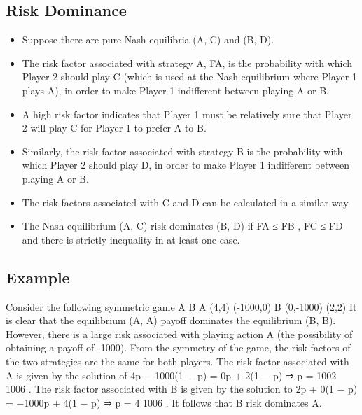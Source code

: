 \documentclass[]{report}
\begin{document}
\subsection{Risk Dominance}
\begin{itemize}
	\item Suppose there are pure Nash equilibria (A, C) and (B, D).
	\item The risk factor associated with strategy A, FA, is the probability
	with which Player 2 should play C (which is used at the Nash
	equilibrium where Player 1 plays A), in order to make Player 1
	indifferent between playing A or B.
	\item 	A high risk factor indicates that Player 1 must be relatively sure
	that Player 2 will play C for Player 1 to prefer A to B.
	\item 	Similarly, the risk factor associated with strategy B is the
	probability with which Player 2 should play D, in order to make
	Player 1 indifferent between playing A or B.
\end{itemize}

\begin{itemize}
	\item The risk factors associated with C and D can be calculated in a
	similar way.
	\item The Nash equilibrium (A, C) risk dominates (B, D) if FA ≤ FB ,
	FC ≤ FD and there is strictly inequality in at least one case.
\end{itemize}

\subsection{Example}
Consider the following symmetric game
A B
A (4,4) (-1000,0)
B (0,-1000) (2,2)
It is clear that the equilibrium (A, A) payoff dominates the
equilibrium (B, B). However, there is a large risk associated with
playing action A (the possibility of obtaining a payoff of -1000).
From the symmetry of the game, the risk factors of the two
strategies are the same for both players.
The risk factor associated with A is given by the solution of
4p − 1000(1 − p) = 0p + 2(1 − p) ⇒ p =
1002
1006
.
The risk factor associated with B is given by the solution to
2p + 0(1 − p) = −1000p + 4(1 − p) ⇒ p =
4
1006
.
It follows that B risk dominates A.
\end{document}
